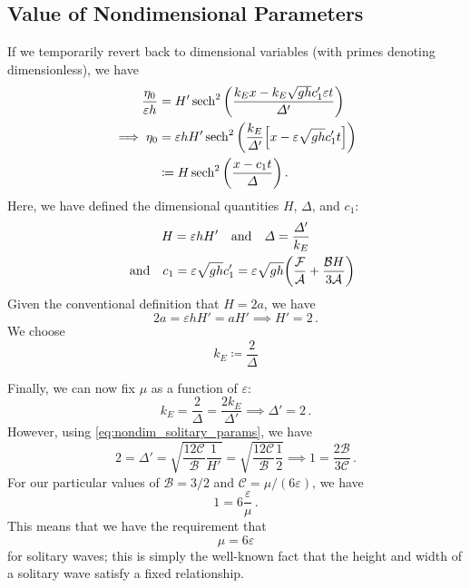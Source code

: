 \documentclass{jfm}
\renewcommand*{\epsilon}{\varepsilon}
\begin{document}
\subsection{Value of Nondimensional Parameters}
If we temporarily revert back to dimensional variables (with primes
denoting dimensionless), we have
\begin{equation}
  \begin{split}
  \frac{\eta_0}{\epsilon h} &= H' \sech^2\pqty{\frac{k_E x - k_E
    \sqrt{gh} c_1' \epsilon t}{\Delta'}}
  \\
  \implies
  \eta_0 &= \epsilon h H'
  \sech^2\pqty{\frac{k_E}{\Delta'} \bqty{x - \epsilon \sqrt{gh} c_1' t}}
  \\
  &\coloneqq H \sech^2\pqty{\frac{x - c_1 t}{\Delta}} \,.
  \end{split}
\end{equation}
Here, we have defined the dimensional quantities $H$, $\Delta$, and $c_1$:
\begin{gather}
  H = \epsilon h H'
  \qq{and}
  \Delta = \frac{\Delta'}{k_E}
  \label{eq:nondim_solitary_params}
  \\
  \qq{and}
  c_1 = \epsilon \sqrt{gh} c_1' = \epsilon \sqrt{gh} \pqty{
    \frac{\mathcal{F}}{\mathcal{A}} +
    \frac{\mathcal{B} H}{3 \mathcal{A}} }
\end{gather}
Given the conventional definition that $H = 2 a$, we have
\begin{equation}
  2 a = \epsilon h H' = a H' \implies H' = 2 \,.
\end{equation}
We choose
\begin{equation}
  k_E \coloneqq \frac{2}{\Delta}
\end{equation}

Finally, we can now fix $\mu$ as a function of $\epsilon$:
\begin{equation}
  k_E = \frac{2}{\Delta} = \frac{2 k_E}{\Delta'}
  \implies \Delta' = 2 \,.
\end{equation}
However, using \cref{eq:nondim_solitary_params}, we have
\begin{equation}
  2 = \Delta ' = \sqrt{\frac{12 \mathcal{C}}{\mathcal{B}}
    \frac{1}{H'}}
  = \sqrt{\frac{12 \mathcal{C}}{\mathcal{B}} \frac{1}{2}}
  \implies 1 = \frac{2 \mathcal{B}}{3 \mathcal{C}} \,.
\end{equation}
For our particular values of $\mathcal{B} = 3/2$ and $\mathcal{C} =
\mu/(6 \epsilon)$, we have
\begin{equation}
  1 = 6 \frac{\epsilon}{\mu} \,.
\end{equation}
This means that we have the requirement that
\begin{equation}
  \mu = 6 \epsilon
\end{equation}
for solitary waves; this is simply the well-known fact that the height
and width of a solitary wave satisfy a fixed relationship.
\end{document}
